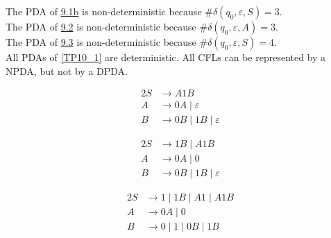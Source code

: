 \documentclass[docid=TP10]{tcom_TP}
\begin{document}
{\begin{center}
\end{center}
The PDA of \hyperref[TP09_1b]{9.1b} is non-deterministic because $\#\delta(q_0,\varepsilon,S)=3$.\\
The PDA of \hyperref[TP09_2]{9.2} is non-deterministic because $\#\delta(q_0,\varepsilon,A)=3$.\\
The PDA of \hyperref[TP09_3]{9.3} is non-deterministic because $\#\delta (q_0,\varepsilon, S)=4$.\\
All PDAs of \ref{TP10_1} are deterministic.
All CFLs can be represented by a NPDA, but not by a DPDA.
\begin{minipage}[c]{0.25\textwidth} \begin{alignat*}{2}
	S &\rightarrow A1B \\
	A &\rightarrow 0A\mid \varepsilon\\
	B &\rightarrow 0B\mid 1B\mid \varepsilon
\end{alignat*} \end{minipage}%
\begin{minipage}[c]{0.25\textwidth} \begin{alignat*}{2}
	S &\rightarrow 1B\mid A1B \\
	A &\rightarrow 0A\mid 0\\
	B &\rightarrow 0B\mid 1B\mid \varepsilon
\end{alignat*} \end{minipage}%
\begin{minipage}[c]{0.25\textwidth} \begin{alignat*}{2}
	S &\rightarrow 1\mid 1B\mid A1\mid A1B \\
	A &\rightarrow 0A\mid 0\\
	B &\rightarrow 0\mid 1\mid 0B\mid 1B
\end{alignat*} \end{minipage}%
}
\end{document}
